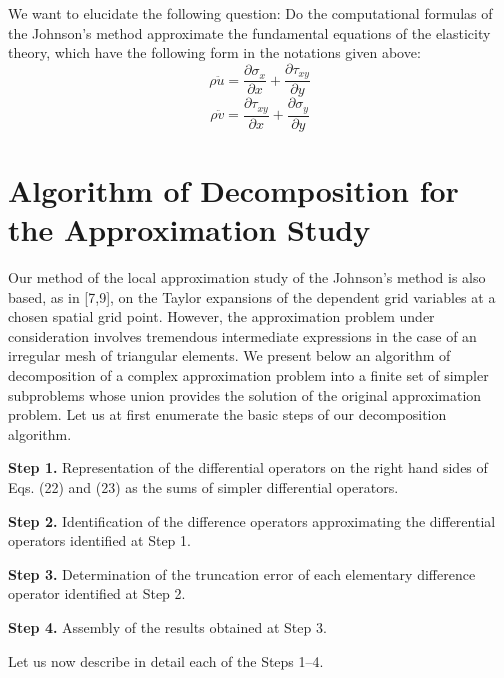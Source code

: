    We want to elucidate the following question: Do the computational formulas
of the Johnson's method approximate the fundamental equations of the
elasticity theory, which have the following form in the notations given above:
\begin{equation}
\rho \ddot{u}=\frac{\partial \sigma_x}{\partial x} + \frac{\partial \tau_{xy}}
{\partial y}
\end{equation}
\begin{equation}
\rho \ddot{v}=\frac{\partial \tau_{xy}}{\partial x} +
\frac{\partial \sigma_y}{\partial y}
\end{equation}

\section{Algorithm of Decomposition for the Approximation Study}
\hspace{6mm}
   Our method of the local approximation study of the Johnson's method is also
based, as in [7,9], on the Taylor expansions of the dependent grid variables
at a chosen spatial grid point. However, the approximation problem under
consideration involves tremendous intermediate expressions in the case of an
irregular mesh of triangular elements. We present below an algorithm of
decomposition of a complex approximation problem into a finite set of simpler
subproblems whose union provides the solution of the original approximation
problem. Let us at first enumerate the basic steps of our decomposition
algorithm.

 {\bf Step 1.} Representation of the differential operators on the right hand
sides of Eqs. (22) and (23) as the sums of simpler differential operators.

 {\bf Step 2.} Identification of the difference operators approximating the
differential operators identified at Step 1.

 {\bf Step 3.} Determination of the truncation error of each elementary
difference operator identified at Step 2.

 {\bf Step 4.} Assembly of the results obtained at Step 3.

   Let us now describe in detail each of the Steps 1--4.

